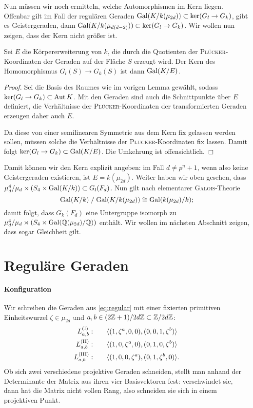 Nun müssen wir noch ermitteln, welche Automorphismen im Kern liegen. Offenbar gilt im Fall der regulären Geraden $\Gal K/{k(\mu_{2d})} \subset \ker(G_l \to G_k)$, gibt es Geistergeraden, dann $\Gal K/{k(\mu_{d(d-2)})} \subset \ker(G_l \to G_k)$. Wir wollen nun zeigen, dass der Kern nicht größer ist.
\begin{lemma}
Sei $E$ die Körpererweiterung von $k$, die durch die Quotienten der \textsc{Plücker}-Koordinaten der Geraden auf der Fläche $S$ erzeugt wird. Der Kern des Homomorphismus $G_l(S) \to G_k(S)$ ist dann $\Gal K/E$.
\end{lemma}
\begin{proof}
Sei die Basis des Raumes wie im vorigen Lemma gewählt, sodass $\ker(G_l \rightarrow G_k) \subset \operatorname{Aut} K$. Mit den Geraden sind auch die Schnittpunkte über $E$ definiert, die Verhältnisse der \textsc{Plücker}-Koordinaten der transformierten Geraden erzeugen daher auch $E$.

Da diese von einer semilinearen Symmetrie aus dem Kern fix gelassen werden sollen, müssen solche die Verhältnisse der \textsc{Plücker}-Koordinaten fix lassen. Damit folgt $\ker(G_l \to G_k) \subset \Gal K/E$. Die Umkehrung ist offensichtlich.
\end{proof}

Damit können wir den Kern explizit angeben: im Fall $d \neq p^n+1$, wenn also keine Geistergeraden existieren, ist $E = k(\mu_{2d})$. Weiter haben wir oben gesehen, dass $\mu_d^4 / \mu_d \rtimes (S_4 \times \Gal K/k) \subset G_l(F_d)$. Nun gilt nach elementarer \textsc{Galois}-Theorie
\begin{equation}
\Gal K/k \;/\; \Gal K/{k(\mu_{2d})} \cong \Gal k(\mu_{2d})/k;
\end{equation}
damit folgt, dass $G_k(F_d)$ eine Untergruppe isomorph zu $\mu_d^4 / \mu_d \rtimes (S_4 \times \Gal \mathbb Q(\mu_{2d})/{\mathbb Q})$ enthält. Wir wollen im nächsten Abschnitt zeigen, dass sogar Gleichheit gilt.

\section{Reguläre Geraden}
\paragraph{Konfiguration} Wir schreiben die Geraden aus \eqref{eq:regular} mit einer fixierten primitiven Einheitswurzel $\zeta \in \mu_{2d}$ und $a,b \in (2\mathbb Z + 1)/2d\mathbb Z \subset \Zmod 2dZ$:
\begin{equation}
\begin{split}
\Lcl(I)_{a,b}  :\qquad	&\langle (1,\zeta^a,0,0), (0,0,1,\zeta^b)\rangle \\
\Lcl(II)_{a,b} :\qquad	&\langle (1,0,\zeta^a,0), (0,1,0,\zeta^b)\rangle \\
\Lcl(III)_{a,b}:\qquad	&\langle (1,0,0,\zeta^a), (0,1,\zeta^b,0)\rangle.
\end{split}
\end{equation}
Ob sich zwei verschiedene projektive Geraden schneiden, stellt man anhand der Determinante der Matrix aus ihren vier Basisvektoren fest: verschwindet sie, dann hat die Matrix nicht vollen Rang, also schneiden sie sich in einem projektiven Punkt.


